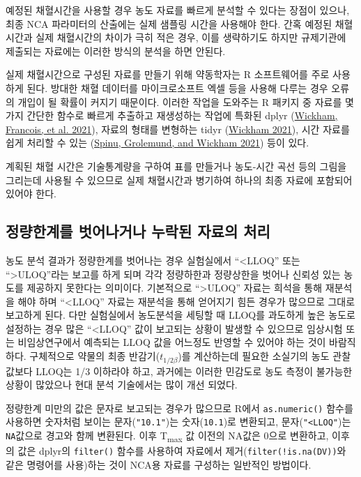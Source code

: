 \documentclass[
  11pt,
  krantz2, a4paper, twoside]{krantz}
\theoremstyle{definition}
\theoremstyle{definition}
\theoremstyle{definition}
\theoremstyle{definition}
\theoremstyle{remark}
\begin{document}
예정된 채혈시간을 사용할 경우 농도 자료를 빠르게 분석할 수 있다는 장점이 있으나, 최종 NCA 파라미터의 산출에는 실제 샘플링 시간을 사용해야 한다. 간혹 예정된 채혈시간과 실제 채혈시간의 차이가 극히 적은 경우, 이를 생략하기도 하지만 규제기관에 제출되는 자료에는 이러한 방식의 분석을 하면 안된다.

실제 채혈시간으로 구성된 자료를 만들기 위해 약동학자는 R 소프트웨어를 주로 사용하게 된다. 방대한 채혈 데이터를 마이크로소프트 엑셀 등을 사용해 다루는 경우 오류의 개입이 될 확률이 커지기 때문이다. 이러한 작업을 도와주는 R 패키지 중 자료를 몇가지 간단한 함수로 빠르게 추출하고 재생성하는 작업에 특화된 dplyr (\protect\hyperlink{ref-R-dplyr}{Wickham, Francois, et al. 2021}), 자료의 형태를 변형하는 tidyr (\protect\hyperlink{ref-R-tidyr}{Wickham 2021}), 시간 자료를 쉽게 처리할 수 있는 (\protect\hyperlink{ref-R-lubridate}{Spinu, Grolemund, and Wickham 2021}) 등이 있다. 

계획된 채혈 시간은 기술통계량을 구하여 표를 만들거나 농도-시간 곡선 등의 그림을 그리는데 사용될 수 있으므로 실제 채혈시간과 병기하여 하나의 최종 자료에 포함되어 있어야 한다.

\hypertarget{uxc815uxb7c9uxd55cuxacc4uxb97c-uxbc97uxc5b4uxb098uxac70uxb098-uxb204uxb77duxb41c-uxc790uxb8ccuxc758-uxcc98uxb9ac}{%
\subsection{정량한계를 벗어나거나 누락된 자료의 처리}\label{uxc815uxb7c9uxd55cuxacc4uxb97c-uxbc97uxc5b4uxb098uxac70uxb098-uxb204uxb77duxb41c-uxc790uxb8ccuxc758-uxcc98uxb9ac}}

농도 분석 결과가 정량한계를 벗어나는 경우 실험실에서 ``\textless LLOQ'' 또는 ``\textgreater ULOQ''라는 보고를 하게 되며 각각 정량하한과 정량상한을 벗어나 신뢰성 있는 농도를 제공하지 못한다는 의미이다. 기본적으로 ``\textgreater ULOQ'' 자료는 희석을 통해 재분석을 해야 하며 ``\textless LLOQ'' 자료는 재분석을 통해 얻어지기 힘든 경우가 많으므로 그대로 보고하게 된다. 다만 실험실에서 농도분석을 세팅할 때 LLOQ를 과도하게 높은 농도로 설정하는 경우 많은 ``\textless LLOQ'' 값이 보고되는 상황이 발생할 수 있으므로 임상시험 또는 비임상연구에서 예측되는 LLOQ 값을 어느정도 반영할 수 있어야 하는 것이 바람직하다. 구체적으로 약물의 최종 반감기(\(t_{1/2\beta}\))를 계산하는데 필요한 소실기의 농도 관찰값보다 LLOQ는 1/3 이하라야 하고, 과거에는 이러한 민감도로 농도 측정이 불가능한 상황이 많았으나 현대 분석 기술에서는 많이 개선 되었다.

정량한계 미만의 값은 문자로 보고되는 경우가 많으므로 R에서 \texttt{as.numeric()} 함수를 사용하면 숫자처럼 보이는 문자(\texttt{"10.1"})는 숫자(\texttt{10.1})로 변환되고, 문자(\texttt{"\textless{}LLOQ"})는 \texttt{NA}값으로 경고와 함께 변환된다. 이후 T\textsubscript{max} 값 이전의 NA값은 0으로 변환하고, 이후의 값은 dplyr의 \texttt{filter()} 함수를 사용하여 자료에서 제거(\texttt{filter(!is.na(DV))}와 같은 명령어를 사용)하는 것이 NCA용 자료를 구성하는 일반적인 방법이다.
\end{document}
